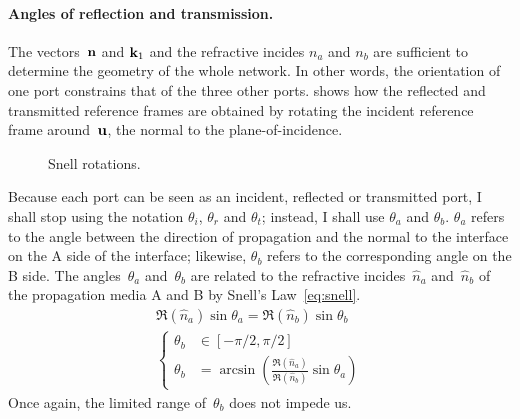\paragraph{Angles of reflection and transmission.}
The vectors~$\mathbf{n}$ and $\mathbf{k}_1$ and the refractive incides $n_a$ and $n_b$ are sufficient to determine the geometry of the whole network.
In other words, the orientation of one port constrains that of the three other ports.
 shows how the reflected and transmitted reference frames are obtained by rotating the incident reference frame around~$\mathbf{u}$, the normal to the plane-of-incidence.
\begin{figure}[hbtp]
    \centering
    \caption{\label{fig:snell_rotations}Snell rotations.}
\end{figure}
Because each port can be seen as an incident, reflected or transmitted port, I shall stop using the notation $\theta_i$, $\theta_r$ and $\theta_t$;
instead, I shall use $\theta_a$ and $\theta_b$.
$\theta_a$ refers to the angle between the direction of propagation and the normal to the interface on the A side of the interface;
likewise, $\theta_b$ refers to the corresponding angle on the B side.
The angles~$\theta_a$ and~$\theta_b$ are related to the refractive incides~$\hat{n}_a$ and~$\hat{n}_b$ of the propagation media A and B by Snell's Law~\eqref{eq:snell}.
\begin{gather}
    \Re(\hat{n}_a) \sin \theta_a = \Re(\hat{n}_b) \sin \theta_b
    \label{eq:snell}
    \\
    \left\lbrace
        \begin{aligned}
            \theta_b &\in [-\pi/2, \pi/2]
            \\
            \theta_b &= \arcsin
            \left(
                \frac{\Re(\hat{n}_a)}{\Re(\hat{n}_b)}
                \sin \theta_a
            \right)
        \end{aligned}
    \right.
    \label{eq:snell_thetab}
\end{gather}
Once again, the limited range of~$\theta_b$ does not impede us.

